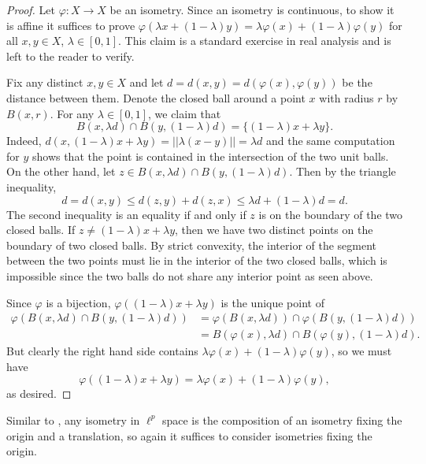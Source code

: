 \documentclass{mystyle}
\begin{document}
\begin{proof}
    Let $\varphi: X \to X$ be an isometry. Since an isometry is continuous, to show it is affine it suffices to prove $\varphi(\lambda x + (1 - \lambda) y) = \lambda \varphi(x) + (1 - \lambda) \varphi(y)$ for all $x, y \in X$, $\lambda \in [0,1]$. This claim is a standard exercise in real analysis and is left to the reader to verify. 

    Fix any distinct $x, y \in X$ and let $d = d(x, y) = d(\varphi(x), \varphi(y))$ be the distance between them. Denote the closed ball around a point $x$ with radius $r$ by $B(x, r)$. For any $\lambda \in [0,1]$, we claim that 
    \[
        B(x, \lambda d) \cap B(y, (1 - \lambda) d) = \{(1 - \lambda) x +  \lambda y\}.
    \]
    Indeed, $d(x, (1 - \lambda) x +  \lambda y) = ||\lambda (x - y)|| = \lambda d$ and the same computation for $y$ shows that the point is contained in the intersection of the two unit balls. On the other hand, let $z \in B(x, \lambda d) \cap B(y, (1 - \lambda) d)$. Then by the triangle inequality,
    \[
        d = d(x, y) \leq d(z, y) + d(z, x) \leq \lambda d + (1 - \lambda) d = d.
    \]
    The second inequality is an equality if and only if $z$ is on the boundary of the two closed balls. If $z \neq (1 - \lambda) x +  \lambda y$, then we have two distinct points on the boundary of two closed balls. By strict convexity, the interior of the segment between the two points must lie in the interior of the two closed balls, which is impossible since the two balls do not share any interior point as seen above. 

    Since $\varphi$ is a bijection, $\varphi((1 - \lambda) x +  \lambda y)$ is the unique point of 
    \begin{align*}
        \varphi(B(x, \lambda d) \cap B(y, (1 - \lambda) d)) 
        &= \varphi(B(x, \lambda d)) \cap \varphi(B(y, (1 - \lambda) d)) \\
        &= B(\varphi(x), \lambda d) \cap B(\varphi(y), (1 - \lambda) d).
    \end{align*}
    But clearly the right hand side contains $\lambda \varphi(x) + (1 - \lambda) \varphi(y)$, so we must have
    \[
        \varphi((1 - \lambda) x +  \lambda y) = \lambda \varphi(x) + (1 - \lambda) \varphi(y),
    \]
    as desired.
\end{proof}
Similar to , any isometry in $\ell^p$ space is the composition of an isometry fixing the origin and a translation, so again it suffices to consider isometries fixing the origin.
\end{document}
